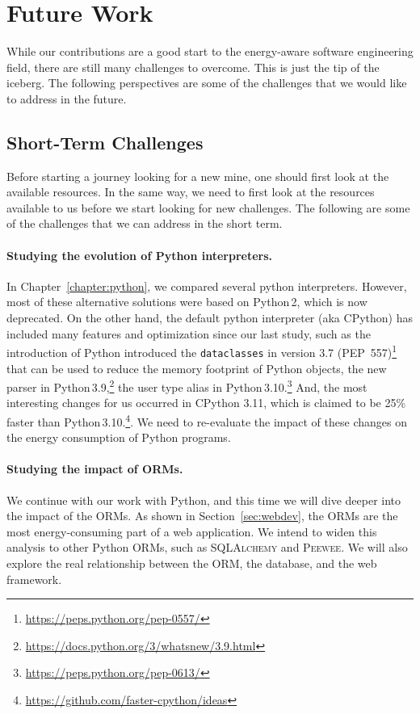 \section{Future Work}
While our contributions are a good start to the energy-aware software engineering field, there are still many challenges to overcome.
This is just the tip of the iceberg.
The following perspectives are some of the challenges that we would like to address in the future.

\subsection{Short-Term Challenges}
Before starting a journey looking for a new mine, one should first look at the available resources.
In the same way, we need to first look at the resources available to us before we start looking for new challenges.
The following are some of the challenges that we can address in the short term.

\paragraph{Studying the evolution of Python interpreters.}
In Chapter~\ref{chapter:python}, we compared several python interpreters.
However, most of these alternative solutions were based on Python\,2, which is now deprecated.
On the other hand, the default python interpreter (aka CPython) has included many features and optimization since our last study, such as the introduction of Python introduced the \texttt{dataclasses} in version 3.7 (PEP~557)\footnote{\url{https://peps.python.org/pep-0557/}} that can be used to reduce the memory footprint of Python objects, the new parser in Python\,3.9,\footnote{\url{https://docs.python.org/3/whatsnew/3.9.html}} the user type alias in Python\,3.10.\footnote{\url{https://peps.python.org/pep-0613/}}
And, the most interesting changes for us occurred in CPython 3.11, which is claimed to be 25\% faster than Python\,3.10.\footnote{\url{https://github.com/faster-cpython/ideas}}.
We need to re-evaluate the impact of these changes on the energy consumption of Python programs.

\paragraph{Studying the impact of ORMs.}
We continue with our work with Python, and this time we will dive deeper into the impact of the ORMs.
As shown in Section~\ref{sec:webdev}, the ORMs are the most energy-consuming part of a web application.
We intend to widen this analysis to other Python ORMs, such as \textsc{SQLAlchemy} and \textsc{Peewee}.
We will also explore the real relationship between the ORM, the database, and the web framework.

